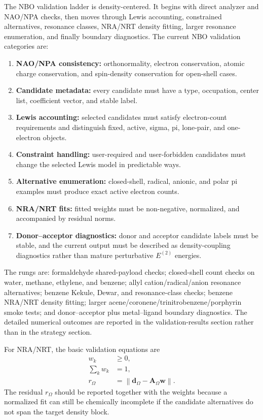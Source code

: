 \documentclass[11pt]{article}
\begin{document}
The NBO validation ladder is density-centered.  It begins with direct analyzer and NAO/NPA checks, then moves through Lewis accounting, constrained alternatives, resonance classes, NRA/NRT density fitting, larger resonance enumeration, and finally boundary diagnostics.  The current NBO validation categories are:
\begin{enumerate}[leftmargin=*]
	\item \textbf{NAO/NPA consistency:} orthonormality, electron conservation, atomic charge conservation, and spin-density conservation for open-shell cases.
	\item \textbf{Candidate metadata:} every candidate must have a type, occupation, center list, coefficient vector, and stable label.
	\item \textbf{Lewis accounting:} selected candidates must satisfy electron-count requirements and distinguish fixed, active, sigma, pi, lone-pair, and one-electron objects.
	\item \textbf{Constraint handling:} user-required and user-forbidden candidates must change the selected Lewis model in predictable ways.
	\item \textbf{Alternative enumeration:} closed-shell, radical, anionic, and polar pi examples must produce exact active electron counts.
	\item \textbf{NRA/NRT fits:} fitted weights must be non-negative, normalized, and accompanied by residual norms.
	\item \textbf{Donor--acceptor diagnostics:} donor and acceptor candidate labels must be stable, and the current output must be described as density-coupling diagnostics rather than mature perturbative $E^{(2)}$ energies.
\end{enumerate}

The rungs are: formaldehyde shared-payload checks; closed-shell count checks on water, methane, ethylene, and benzene; allyl cation/radical/anion resonance alternatives; benzene Kekule, Dewar, and resonance-class checks; benzene NRA/NRT density fitting; larger acene/coronene/trinitrobenzene/porphyrin smoke tests; and donor--acceptor plus metal--ligand boundary diagnostics.  The detailed numerical outcomes are reported in the validation-results section rather than in the strategy section.

For NRA/NRT, the basic validation equations are
\begin{equation}
\begin{aligned}
	w_k &\geq 0, \\
	\sum_k w_k &= 1, \\
	r_{\Omega} &= \left\|\mathbf{d}_{\Omega}-\mathbf{A}_{\Omega}\mathbf{w}\right\|.
\end{aligned}
\end{equation}
The residual $r_{\Omega}$ should be reported together with the weights because a normalized fit can still be chemically incomplete if the candidate alternatives do not span the target density block.
\end{document}
